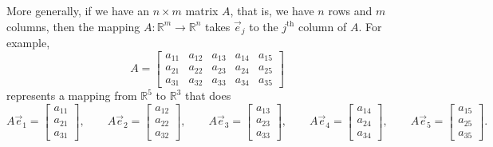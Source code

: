 More generally, if we have an $n \times m$ matrix $A$, that is, we have $n$ rows
and $m$ columns, then the mapping $A \colon {\mathbb R}^m \to {\mathbb R}^n$
takes $\vec{e}_j$ to the $j^{\text{th}}$ column of $A$.
For example,
\begin{equation*}
A = 
\begin{bmatrix}
a_{11} & a_{12} & a_{13} & a_{14} & a_{15} \\
a_{21} & a_{22} & a_{23} & a_{24} & a_{25} \\
a_{31} & a_{32} & a_{33} & a_{34} & a_{35}
\end{bmatrix}
\end{equation*}
represents a mapping from ${\mathbb R}^5$ to ${\mathbb R}^3$ that does
\begin{equation*}
A \vec{e}_1 =
\begin{bmatrix}
a_{11} \\ a_{21} \\ a_{31}
\end{bmatrix} ,
\qquad
A \vec{e}_2 =
\begin{bmatrix}
a_{12} \\ a_{22} \\ a_{32}
\end{bmatrix} ,
\qquad
A \vec{e}_3 =
\begin{bmatrix}
a_{13} \\ a_{23} \\ a_{33}
\end{bmatrix} ,
\qquad
A \vec{e}_4 =
\begin{bmatrix}
a_{14} \\ a_{24} \\ a_{34}
\end{bmatrix} ,
\qquad
A \vec{e}_5 =
\begin{bmatrix}
a_{15} \\ a_{25} \\ a_{35}
\end{bmatrix} .
\end{equation*}

